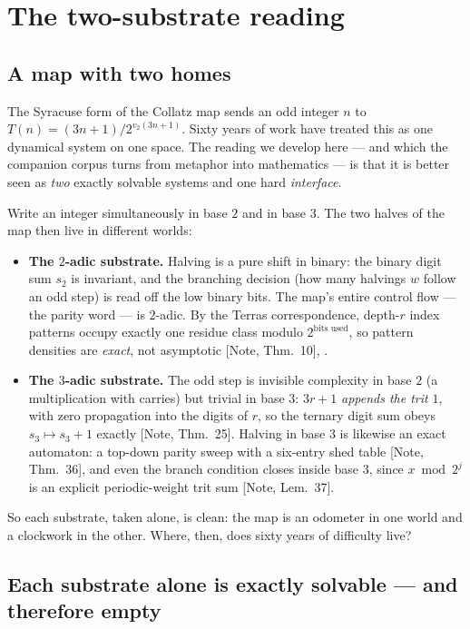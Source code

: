 \documentclass[11pt]{article}
\theoremstyle{definition}
\theoremstyle{remark}
\newcommand{\anchor}[1]{\textup{[#1]}}
\newcommand{\vtwo}{v_2}
\begin{document}
\section{The two-substrate reading}
\label{sec:substrates}

\subsection{A map with two homes}

The Syracuse form of the Collatz map sends an odd integer $n$ to
$T(n) = (3n+1)/2^{\vtwo(3n+1)}$. Sixty years of work have treated this as one
dynamical system on one space. The reading we develop here --- and which the
companion corpus turns from metaphor into mathematics --- is that it is better
seen as \emph{two} exactly solvable systems and one hard \emph{interface}.

Write an integer simultaneously in base $2$ and in base $3$. The two halves of
the map then live in different worlds:

\begin{itemize}[leftmargin=2em]
\item \textbf{The $2$-adic substrate.} Halving is a pure shift in binary: the
binary digit sum $s_2$ is invariant, and the branching decision (how many
halvings $w$ follow an odd step) is read off the low binary bits. The map's
entire control flow --- the parity word --- is $2$-adic. By the Terras
correspondence, depth-$r$ index patterns occupy exactly one residue class
modulo $2^{\text{bits used}}$, so pattern densities are \emph{exact}, not
asymptotic \anchor{Note, Thm.~10}, \cite{Terras1976}.
\item \textbf{The $3$-adic substrate.} The odd step is invisible complexity in
base $2$ (a multiplication with carries) but trivial in base $3$: $3r+1$
\emph{appends the trit} $1$, with zero propagation into the digits of $r$, so
the ternary digit sum obeys $s_3 \mapsto s_3+1$ exactly \anchor{Note,
Thm.~25}. Halving in base $3$ is likewise an exact automaton: a top-down
parity sweep with a six-entry shed table \anchor{Note, Thm.~36}, and even the
branch condition closes inside base $3$, since $x \bmod 2^j$ is an explicit
periodic-weight trit sum \anchor{Note, Lem.~37}.
\end{itemize}

So each substrate, taken alone, is clean: the map is an odometer in one world
and a clockwork in the other. Where, then, does sixty years of difficulty
live?

\subsection{Each substrate alone is exactly solvable --- and therefore empty}
\end{document}
